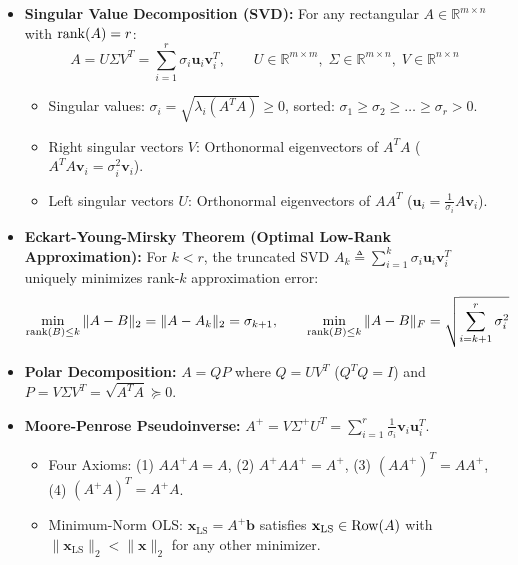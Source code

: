 \begin{tcolorbox}[breakable, colback=coralbg!30, colframe=coralborder, title={\large \textbf{3. SVD, Pseudoinverse \& Principal Component Analysis (Weeks 5--7)}}]
\begin{itemize}[leftmargin=*, noitemsep, topsep=2pt]
    \item \textbf{Singular Value Decomposition (SVD):}
    For any rectangular $A \in \mathbb{R}^{m \times n}$ with $\operatorname{rank}(A) = r$:
    \begin{equation*}
    A = U \Sigma V^T = \sum_{i=1}^r \sigma_i \mathbf{u}_i \mathbf{v}_i^T, \qquad U \in \mathbb{R}^{m \times m}, \; \Sigma \in \mathbb{R}^{m \times n}, \; V \in \mathbb{R}^{n \times n}
    \end{equation*}
    \begin{itemize}[leftmargin=*, noitemsep]
        \item Singular values: $\sigma_i = \sqrt{\lambda_i(A^T A)} \ge 0$, sorted: $\sigma_1 \ge \sigma_2 \ge \dots \ge \sigma_r > 0$.
        \item Right singular vectors $V$: Orthonormal eigenvectors of $A^T A$ ($A^T A \mathbf{v}_i = \sigma_i^2 \mathbf{v}_i$).
        \item Left singular vectors $U$: Orthonormal eigenvectors of $A A^T$ ($\mathbf{u}_i = \frac{1}{\sigma_i} A \mathbf{v}_i$).
    \end{itemize}
    \item \textbf{Eckart-Young-Mirsky Theorem (Optimal Low-Rank Approximation):}
    For $k < r$, the truncated SVD $A_k \triangleq \sum_{i=1}^k \sigma_i \mathbf{u}_i \mathbf{v}_i^T$ uniquely minimizes rank-$k$ approximation error:
    \begin{equation*}
    \min_{\operatorname{rank}(B) \le k} \|A - B\|_2 = \|A - A_k\|_2 = \sigma_{k+1}, \qquad \min_{\operatorname{rank}(B) \le k} \|A - B\|_F = \sqrt{\sum_{i=k+1}^r \sigma_i^2}
    \end{equation*}
    \item \textbf{Polar Decomposition:} $A = Q P$ where $Q = U V^T$ ($Q^T Q = I$) and $P = V \Sigma V^T = \sqrt{A^T A} \succeq 0$.
    \item \textbf{Moore-Penrose Pseudoinverse:} $A^+ = V \Sigma^+ U^T = \sum_{i=1}^r \frac{1}{\sigma_i} \mathbf{v}_i \mathbf{u}_i^T$.
    \begin{itemize}[leftmargin=*, noitemsep]
        \item Four Axioms: (1) $A A^+ A = A$, (2) $A^+ A A^+ = A^+$, (3) $(A A^+)^T = A A^+$, (4) $(A^+ A)^T = A^+ A$.
        \item Minimum-Norm OLS: $\mathbf{x}_{\text{LS}} = A^+ \mathbf{b}$ satisfies $\mathbf{x}_{\text{LS}} \in \operatorname{Row}(A)$ with $\|\mathbf{x}_{\text{LS}}\|_2 < \|\mathbf{x}\|_2$ for any other minimizer.

\end{itemize}
\end{itemize}
\end{tcolorbox}
